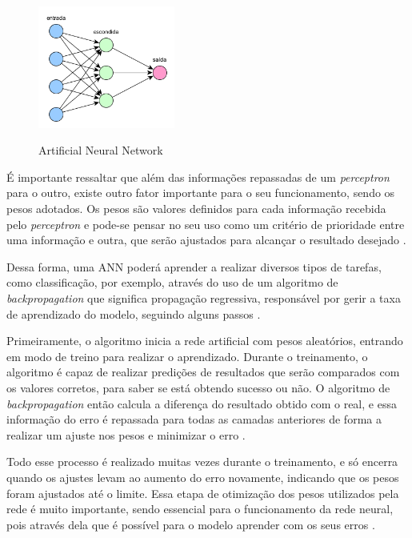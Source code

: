 \begin{figure}[!htb]
	\centering
	\caption{Artificial Neural Network}
	\includegraphics[width=0.40\textwidth]{img/neuralNetwork.png}
	\label{fig:neuralNetwork}
\end{figure}

É importante ressaltar que além das informações repassadas de um \emph{perceptron} para o outro, existe outro fator importante para o seu funcionamento, sendo os pesos adotados. Os pesos são valores definidos para cada informação recebida pelo \emph{perceptron} e pode-se pensar no seu uso como um critério de prioridade entre uma informação e outra, que serão ajustados para alcançar o resultado desejado \cite{deepLearningTensorFlow}.

Dessa forma, uma ANN poderá aprender a realizar diversos tipos de tarefas, como classificação, por exemplo, através do uso de um algoritmo de \emph{backpropagation} que significa propagação regressiva, responsável por gerir a taxa de aprendizado do modelo, seguindo alguns passos \cite{deepLearningTensorFlow}.

Primeiramente, o algoritmo inicia a rede artificial com pesos aleatórios, entrando em modo de treino para realizar o aprendizado. Durante o treinamento, o algoritmo é capaz de realizar predições de resultados que serão comparados com os valores corretos, para saber se está obtendo sucesso ou não. O algoritmo de \emph{backpropagation} então calcula a diferença do resultado obtido com o real, e essa informação do erro é repassada para todas as camadas anteriores de forma a realizar um ajuste nos pesos e minimizar o erro \cite{deepLearningTensorFlow}.

Todo esse processo é realizado muitas vezes durante o treinamento, e só encerra quando os ajustes levam ao aumento do erro novamente, indicando que os pesos foram ajustados até o limite. Essa etapa de otimização dos pesos utilizados pela rede é muito importante, sendo essencial para o funcionamento da rede neural, pois através dela que é possível para o modelo aprender com os seus erros \cite{deepLearningTensorFlow}.

